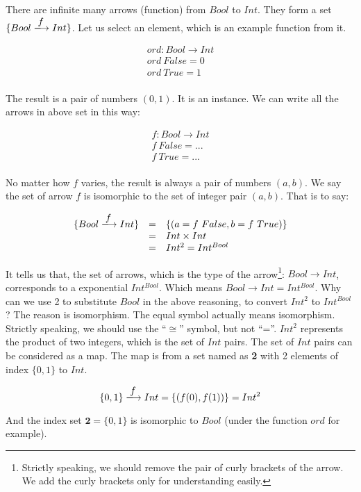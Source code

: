 \documentclass{article}
\begin{document}
\begin{example}
\normalfont
There are infinite many arrows (function) from $Bool$ to $Int$. They form a set $\{Bool \arrowto{f} Int\}$. Let us select an element, which is an example function from it.

\[
\begin{array}{l}
ord : Bool \to Int \\
ord\ False = 0 \\
ord\ True = 1 \\
\end{array}
\]

The result is a pair of numbers $(0, 1)$. It is an instance. We can write all the arrows in above set in this way:

\[
\begin{array}{l}
f : Bool \to Int \\
f\ False = ... \\
f\ True = ... \\
\end{array}
\]

No matter how $f$ varies, the result is always a pair of numbers $(a, b)$. We say the set of arrow $f$ is isomorphic to the set of integer pair $(a, b)$. That is to say:

\[
\begin{array}{rcl}
\{Bool \arrowto{f} Int\} & = & \{(a = f\ False, b = f\ True)\} \\
  & = & Int \times Int \\
  & = & Int^2 = Int^{Bool}
\end{array}
\]

It tells us that, the set of arrows, which is the type of the arrow\footnote{Strictly speaking, we should remove the pair of curly brackets of the arrow. We add the curly brackets only for understanding easily.}: $Bool \to Int$, corresponds to a exponential $Int^{Bool}$. Which means $Bool \to Int = Int^{Bool}$. Why can we use 2 to substitute $Bool$ in the above reasoning, to convert $Int^2$ to $Int^{Bool}$? The reason is isomorphism. The equal symbol actually means isomorphism. Strictly speaking, we should use the ``$\cong$'' symbol, but not ``=''. $Int^2$ represents the product of two integers, which is the set of $Int$ pairs. The set of $Int$ pairs can be considered as a map. The map is from a set named as \textbf{2} with 2 elements of index $\{0, 1\}$ to $Int$.

\[
\{0, 1\} \arrowto{f} Int = \{(f(0), f(1))\} = Int^2
\]

And the index set $\mathbf{2} = \{0, 1\}$ is isomorphic to $Bool$ (under the function $ord$ for example).
\end{example}
\end{document}
